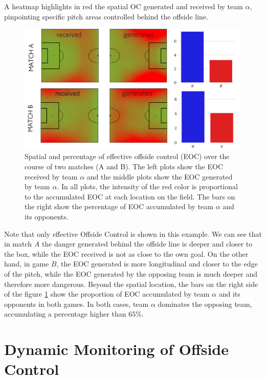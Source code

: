\documentclass[
  10pt,
  twoside,nohyper]{book}
\begin{document}
A heatmap highlights in red the spatial OC generated and received by team \(\alpha\), pinpointing specific pitch areas controlled behind the offside line.

\begin{figure}[H]

{\centering \includegraphics[width=0.8\linewidth,]{imagenes/Games_OC} 

}

\caption{Spatial and percentage of effective offside control (EOC) over the course of two matches (A and B). The left plots show the EOC received by team $\alpha$ and the middle plots show the EOC generated by team $\alpha$. In all plots, the intensity of the red color is proportional to the accumulated EOC at each location on the field. The bars on the right show the percentage of EOC accumulated by team $\alpha$ and its opponents.}\label{fig:games}
\end{figure}

Note that only effective Offside Control is shown in this example. We can see that in match \(A\) the danger generated behind the offside line is deeper and closer to the box, while the EOC received is not as close to the own goal. On the other hand, in game \(B\), the EOC generated is more longitudinal and closer to the edge of the pitch, while the EOC generated by the opposing team is much deeper and therefore more dangerous. Beyond the spatial location, the bars on the right side of the figure \ref{fig:games} show the proportion of EOC accumulated by team \(\alpha\) and its opponents in both games. In both cases, team \(\alpha\) dominates the opposing team, accumulating a percentage higher than \(65\%\).

\pagebreak

\section{Dynamic Monitoring of Offside Control}\label{dynamic-monitoring-of-offside-control}
\end{document}
